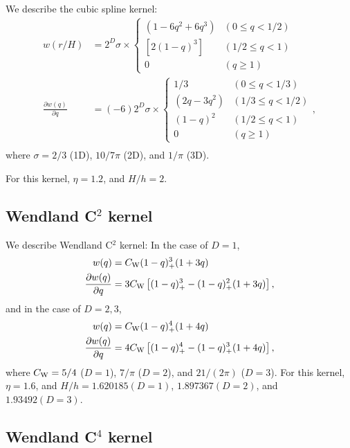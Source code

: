 \documentclass[fleqn,dvipdfmx]{article}
\begin{document}
We describe the cubic spline kernel:
\begin{align}
  w(r/H) &= 2^D \sigma \times \left\{
  \begin{array}{ll}
    \left( 1 - 6 q^2 + 6 q^3 \right) & (0 \le q < 1/2) \\
    \left[ 2 (1 - q)^3 \right] & (1/2 \le q < 1) \\
    0 & (q \ge 1)
  \end{array}
  \right. \\
  \frac{\partial w(q)}{\partial q} &= (-6) 2^D \sigma
  \times \left\{
  \begin{array}{ll}
    1/3 & (0 \le q < 1/3) \\
    \left(2q - 3q^2 \right) & (1/3 \le q < 1/2) \\
    (1 - q)^2 & (1/2 \le q < 1) \\
    0 & (q \ge 1)
  \end{array}
  \right., \\
\end{align}
where $\sigma = 2/3$ (1D), $10/7\pi$ (2D), and $1/\pi$ (3D).

For this kernel, $\eta=1.2$, and $H/h=2$.

\subsection{Wendland C$^2$ kernel}

We describe Wendland C$^2$ kernel: In the case of $D = 1$,
\begin{align}
  w(q) &= C_{\rm W} (1-q)_+^3 (1+3q) \\ \frac{\partial w(q)}{\partial
    q} &= 3 C_{\rm W} \left[(1-q)^3_+ - (1-q)^2_+ (1+3q) \right],
\end{align}
and in the case of $D = 2, 3$,
\begin{align}
  w(q) &= C_{\rm W} (1-q)_+^4 (1+4q) \\ \frac{\partial w(q)}{\partial
    q} &= 4 C_{\rm W} \left[(1-q)^4_+ - (1-q)^3_+ (1+4q) \right],
\end{align}
where $C_{\rm W}=5/4$ ($D=1$), $7/\pi$ ($D=2$), and $21/(2\pi)$
($D=3$). For this kernel, $\eta=1.6$, and $H/h=1.620185(D=1)$,
$1.897367(D=2)$, and $1.93492(D=3)$.

\subsection{Wendland C$^4$ kernel}
\end{document}
